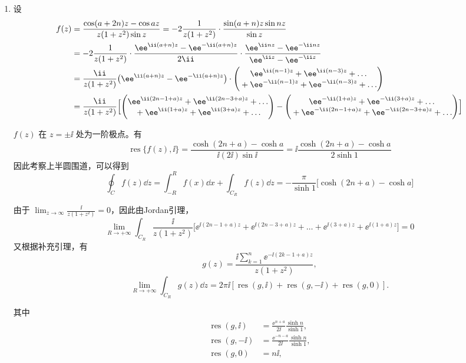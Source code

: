 \begin{question}
\begin{solution}
\begin{enumerate}
故
\[
\int_{-\infty}^{\infty}\frac{\cos x}{x^2-2x+2}\dd{x}
=\Re\int_{-\infty}^{\infty}f(x)\dd{x}
=\frac{\pi}{\ee}\cos1.
\]

  \item 设
\[
\begin{aligned}
f(z)&=\frac{\cos(a+2n)z-\cos a z}{z(1+z^2)\sin z}=-2\frac{1}{z(1+z^2)}\cdot\frac{\sin(a+n)z\sin nz}{\sin z}\\
&=-2\frac{1}{z(1+z^2)}\cdot\frac{\ee^{\ii(a+n)z}-\ee^{-\ii(a+n)z}}{2\ii}\cdot\frac{\ee^{\ii nz}-\ee^{-\ii nz}}{\ee^{\ii z}-\ee^{-\ii z}}\\
&=\frac{\ii}{z(1+z^2)}\bigl(\ee^{\ii(a+n)z}-\ee^{-\ii(a+n)z}\bigr)\cdot\begin{pmatrix}
\ee^{\ii(n-1)z}+\ee^{\ii(n-3)z}+\dots \\ {}+\ee^{-\ii(n-1)z}+\ee^{-\ii(n-3)z}+\dots
\end{pmatrix}\\
&=\frac{\ii}{z(1+z^2)}\Bigl[\begin{pmatrix}
\ee^{\ii(2n-1+a)z}+\ee^{\ii(2n-3+a)z}+\dots \\ {}+\ee^{\ii(1+a)z}+\ee^{\ii(3+a)z}+\dots
\end{pmatrix}-\begin{pmatrix}
\ee^{-\ii(1+a)z}+\ee^{-\ii(3+a)z}+\dots \\ {}+\ee^{-\ii(2n-1+a)z}+\ee^{-\ii(2n-3+a)z}+\dots
\end{pmatrix}\Bigr]
\end{aligned}
\]

\(f(z)\) 在 \(z=\pm\ii\) 处为一阶极点。有
\[
\operatorname{res}\{f(z),\ii\}=\frac{\cosh(2n+a)-\cosh a}{\ii(2\ii)\sin\ii}=\ii\frac{\cosh(2n+a)-\cosh a}{2\sinh1}
\]
因此考察上半圆围道，可以得到
\[
\oint_C f(z)\dd{z}=\int_{-R}^{R}f(x)\dd{x}+\int_{C_R}f(z)\dd{z}=-\frac{\pi}{\sinh1}\bigl[\cosh(2n+a)-\cosh a\bigr]
\]

由于 \(\displaystyle\lim_{z\to\infty}\frac{\ii}{z(1+z^2)}=0\)，因此由Jordan引理，
\[
\lim_{R\to+\infty}\int_{C_R}\frac{\ii}{z(1+z^2)}\bigl[\ee^{\ii(2n-1+a)z}+\ee^{\ii(2n-3+a)z}+\dots+\ee^{\ii(3+a)z}+\ee^{\ii(1+a)z}\bigr]=0
\]
又根据补充引理，有
\[
g(z)=\frac{\ii\sum_{k=1}^{n}\ee^{-\ii(2k-1+a)z}}{z(1+z^2)},
\]
\[
\lim_{R\to+\infty}\int_{C_R}g(z)\dd{z}
=2\pi\ii\left[
\operatorname{res}(g,\ii)+\operatorname{res}(g,-\ii)+\operatorname{res}(g,0)
\right].
\]

其中
\[
\begin{aligned}
\operatorname{res}(g,\ii)
&=\frac{\ee^{n+a}}{2\ii}\frac{\sinh n}{\sinh1},\\
\operatorname{res}(g,-\ii)
&=\frac{\ee^{-n-a}}{2\ii}\frac{\sinh n}{\sinh1},\\
\operatorname{res}(g,0)&=n\ii,
\end{aligned}
\]


\end{enumerate}
\end{solution}
\end{question}
